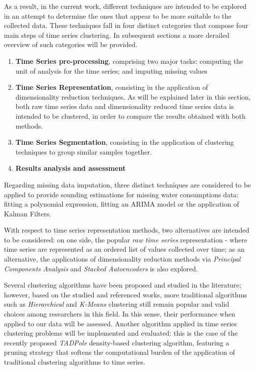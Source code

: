 \documentclass[9pt,journal,compsoc]{IEEEtran}
\begin{document}
As a result, in the current work, different techniques are intended to be explored in an attempt to determine the ones that appear to be more suitable to the collected data. These techniques fall in four distinct categories that compose four main steps of time series clustering. In subsequent sections a more derailed overview of such categories will be provided.

\begin{enumerate}
	\item \textbf{Time Series pre-processing}, comprising two major tasks: computing the unit of analysis for the time series; and imputing missing values
	
	\item \textbf{Time Series Representation}, consisting in the application of dimensionality reduction techniques. As will be explained later in this section, both raw time series data and dimensionality reduced time series data is intended to be clustered, in order to compare the results obtained with both methods.
	
	\item \textbf{Time Series Segmentation}, consisting in the application of clustering techniques to group similar samples together.
	
	\item \textbf{Results analysis and assessment}
\end{enumerate}
 
Regarding missing data imputation, three distinct techniques are considered to be applied to provide sounding estimations for missing water consumptions data: fitting a polynomial expression, fitting an ARIMA model or the application of Kalman Filters.

With respect to time series representation methods, two alternatives are intended to be considered: on one side, the popular \emph{raw time series} representation - where time series are represented as an ordered list of values collected over time; as an alternative, the applications of dimensionality reduction methods via \emph{Principal Components Analysis} and \emph{Stacked Autoencoders} is also explored.
	
Several clustering algorithms have been proposed and studied in the literature; however, based on the studied and referenced works, more traditional algorithms such as \emph{Hierarchical} and \emph{K-Means} clustering still remain popular and valid choices among researchers in this field. In this sense, their performance when applied to our data will be assessed. Another algorithm applied in time series clustering problems will be implemented and evaluated: this is the case of the recently proposed \emph{TADPole} density-based clustering algorithm, featuring a pruning strategy that softens the computational burden of the application of traditional clustering algorithms to time series.
\end{document}
